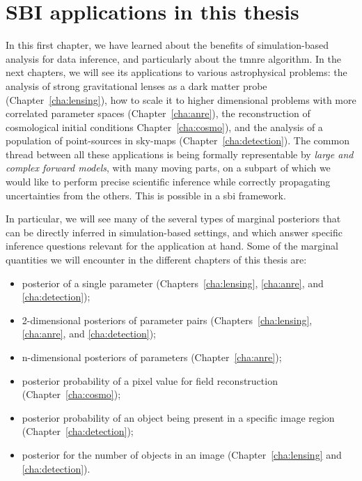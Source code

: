 \section{SBI applications in this thesis} \label{sec:applications}

In this first chapter, we have learned about the benefits of simulation-based analysis for data inference, and particularly about the \gls*{tmnre} algorithm. In the next chapters, we will see its applications to various astrophysical problems: the analysis of strong gravitational lenses as a dark matter probe (Chapter~\ref{cha:lensing}), how to scale it to higher dimensional problems with more correlated parameter spaces (Chapter~\ref{cha:anre}), the reconstruction of cosmological initial conditions Chapter~\ref{cha:cosmo}), and the analysis of a population of point-sources in sky-maps (Chapter~\ref{cha:detection}). The common thread between all these applications is being formally representable by \emph{large and complex forward models}, with many moving parts, on a subpart of which we would like to perform precise scientific inference while correctly propagating uncertainties from the others. This is possible in a \gls*{sbi} framework.

In particular, we will see many of the several types of marginal posteriors that can be directly inferred in simulation-based settings, and which answer specific inference questions relevant for the application at hand. Some of the marginal quantities we will encounter in the different chapters of this thesis are:
\begin{itemize}[leftmargin=1cm]
	\item posterior of a single parameter (Chapters~\ref{cha:lensing}, \ref{cha:anre}, and \ref{cha:detection});
	\item 2-dimensional posteriors of parameter pairs (Chapters~\ref{cha:lensing}, \ref{cha:anre}, and \ref{cha:detection});
	\item n-dimensional posteriors of parameters (Chapter~\ref{cha:anre});
	\item posterior probability of a pixel value for field reconstruction (Chapter~\ref{cha:cosmo});
    \item posterior probability of an object being present in a specific image region (Chapter~\ref{cha:detection});
	\item posterior for the number of objects in an image  (Chapter~\ref{cha:lensing} and \ref{cha:detection}).
\end{itemize}


